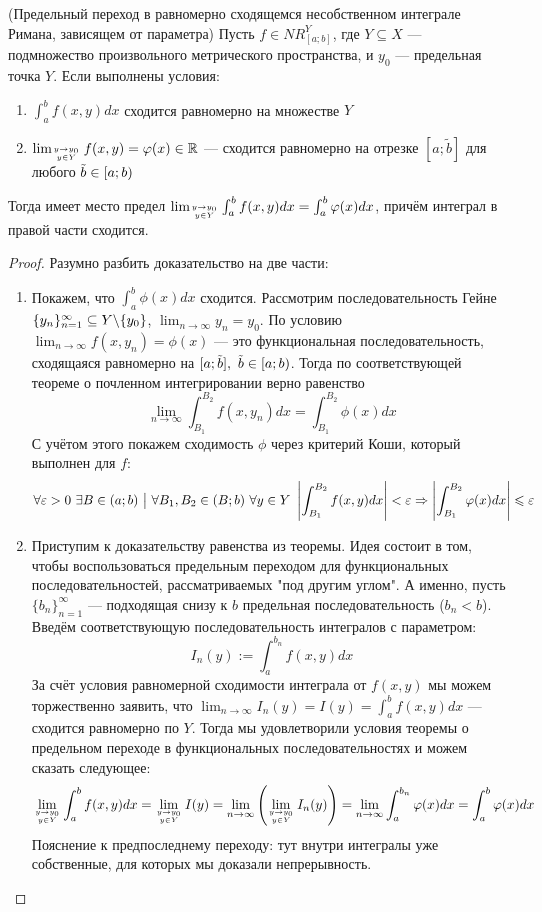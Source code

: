 \begin{theorem} (Предельный переход в равномерно сходящемся несобственном интеграле Римана, зависящем от параметра)
	Пусть $f \in NR_{[a; b]}^Y$, где $Y \subseteq X$ --- подмножество произвольного метрического пространства, и $y_0$ --- предельная точка $Y$. Если выполнены условия:
	\begin{enumerate}
		\item $\int_a^b f(x, y)dx$ сходится равномерно на множестве $Y$
		
		\item $\lim_{y \to y_0 \atop {y \in Y}} f(x, y) = \phi(x) \in \R$ --- сходится равномерно на отрезке $[a; \tilde{b}]$ для любого $\tilde{b} \in \lsi{a; b}$ 
	\end{enumerate}
	Тогда имеет место предел $\lim_{y \to y_0 \atop {y \in Y}} \int_a^b f(x, y)dx = \int_a^b \phi(x)dx$, причём интеграл в правой части сходится.
\end{theorem}

\begin{proof}
	Разумно разбить доказательство на две части:
	\begin{enumerate}
		\item Покажем, что $\int_a^b \phi(x)dx$ сходится. Рассмотрим последовательность Гейне $\{y_n\}_{n = 1}^\infty \subseteq Y \bs \{y_0\}$, $\lim_{n \to \infty} y_n = y_0$. По условию $\lim_{n \to \infty} f(x, y_n) = \phi(x)$ --- это функциональная последовательность, сходящаяся равномерно на $[a; \tilde{b}],\ \tilde{b} \in \lsi{a; b}$. Тогда по соответствующей теореме о почленном интегрировании верно равенство
		\[
			\lim_{n \to \infty} \int_{B_1}^{B_2} f(x, y_n)dx = \int_{B_1}^{B_2} \phi(x)dx
		\]
		С учётом этого покажем сходимость $\phi$ через критерий Коши, который выполнен для $f$:
		\[
			\forall \eps > 0\ \exists B \in (a; b) \such \forall B_1, B_2 \in (B; b) \ \forall y \in Y \ \md{\int_{B_1}^{B_2} f(x, y)dx} < \eps \Ra \md{\int_{B_1}^{B_2} \phi(x)dx} \le \eps
		\]
		
		\item Приступим к доказательству равенства из теоремы. Идея состоит в том, чтобы воспользоваться предельным переходом для функциональных последовательностей, рассматриваемых "под другим углом". А именно, пусть $\{b_n\}_{n = 1}^\infty$ --- подходящая снизу к $b$ предельная последовательность ($b_n < b$). Введём соответствующую последовательность интегралов с параметром:
		\[
			I_n(y) := \int_a^{b_n} f(x, y)dx
		\]
		За счёт условия равномерной сходимости интеграла от $f(x, y)$ мы можем торжественно заявить, что $\lim_{n \to \infty} I_n(y) = I(y) = \int_a^b f(x, y)dx$ --- сходится равномерно по $Y$. Тогда мы удовлетворили условия теоремы о предельном переходе в функциональных последовательностях и можем сказать следующее:
		\[
			\lim_{y \to y_0 \atop {y \in Y}} \int_a^b f(x, y)dx = \lim_{y \to y_0 \atop {y \in Y}} I(y) = \lim_{n \to \infty} \ps{\lim_{y \to y_0 \atop {y \in Y}} I_n(y)} = \lim_{n \to \infty} \int_a^{b_n} \phi(x)dx = \int_a^b \phi(x)dx
		\]
		Пояснение к предпоследнему переходу: тут внутри интегралы уже собственные, для которых мы доказали непрерывность.
	\end{enumerate}
\end{proof}

